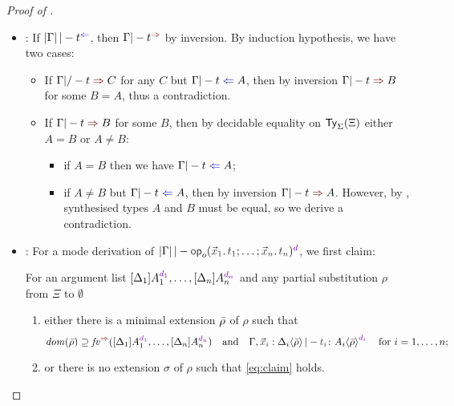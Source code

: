 \begin{proof}[Proof of {}]
\begin{itemize}
    \item {}: If $\erase{\Gamma} |-t^{\chk}$, then $\Gamma |- t^{\syn}$ by inversion.
      By induction hypothesis, we have two cases: %
      \begin{itemize}
        \item If $\Gamma |/- t \syn C$ for any $C$ but $\Gamma |- t \chk A$, then by inversion $\Gamma |- t \syn B$ for some $B = A$, thus a contradiction.
        \item If $\Gamma |- t \syn B$ for some $B$, then by decidable equality on $\mathsf{Ty}_{\Sigma}(\Xi)$ either $A = B$ or $A \neq B$: 
          \begin{itemize}
            \item if $A = B$ then we have\/ $\Gamma |- t \chk A$;
            \item if $A \neq B$ but $\Gamma |- t \chk A$, then by inversion $\Gamma |- t \syn A$.
              However, by , synthesised types $A$ and $B$ must be equal, so we derive a contradiction.
          \end{itemize}
      \end{itemize}
    \item {}:
      For a mode derivation of $\erase{\Gamma} |- \tmOpts^{\dir{d}}$, we first claim:
      \begin{claim}\label{lem:args-induction}
        For an argument list $\biargs$ and any partial substitution $\rho$ from $\Xi$ to $\emptyset$
        \begin{enumerate}
          \item either there is a minimal extension $\bar{\rho}$ of $\rho$ such that 
            \begin{equation} \label{eq:claim}
              \dom(\ext{\rho}) \supseteq \synvar(\biargs)
              \quad\text{and}\quad
              \Gamma, \vars{x}_\isTerm{i} : \simsub{\Delta_i}{\ext{\rho}} |- \isTerm{t_i} \colon \simsub{A_i}{\ext{\rho}}^{\dir{d_i}}
              \quad\text{for $i = 1, \ldots, n$};
            \end{equation}
          \item or there is no extension $\sigma$ of $\rho$ such that \eqref{eq:claim} holds.
        \end{enumerate}
      \end{claim}


\end{itemize}
\end{proof}
